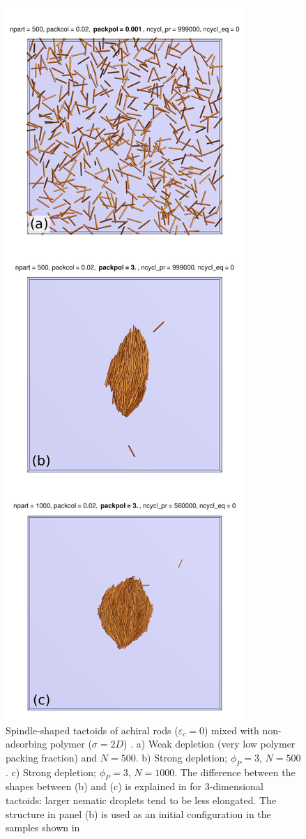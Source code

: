 \begin{figure}
	\includegraphics[width = 0.4 \columnwidth]{figures/chapter-6/impl_depletion_effect}
	\caption{ Spindle-shaped tactoids of achiral rods ($\varepsilon_{c}=0$) mixed with non-adsorbing polymer ($\sigma = 2D$) . a) Weak depletion  (very low polymer packing fraction) and $N=500$. b) Strong depletion; $\phi_{P} =3$, $N=500$. c) Strong depletion; $\phi_{P} =3$, $N=1000$. The difference between the shapes between (b) and (c) is explained in \cite{kuhnhold2022structure} for 3-dimensional tactoids: larger nematic droplets tend to be less elongated. The structure in panel (b) is used as an initial configuration in the samples shown in }
	\label{notwist}
\end{figure}



\clearpage